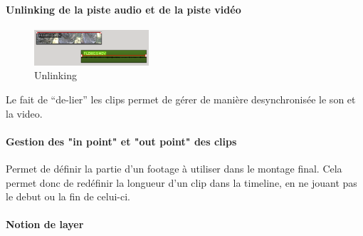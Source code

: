 \paragraph{}

\paragraph{Unlinking de la piste audio et de la piste vidéo}

\begin{figure}

  \vspace{-20pt} \begin{center}

  \includegraphics[width=0.38\textwidth]{images/unlinked}

  \end{center} \vspace{-30pt} \caption{Unlinking} \label{Yes}

  \vspace{-10pt}

\end{figure}

Le fait de ``de-lier'' les clips permet de gérer de manière
desynchronisée le son et la video.

\paragraph{Gestion des "in point" et  "out point" des clips} %

  Permet de définir la partie d'un footage à utiliser dans le montage
  final. Cela permet donc de redéfinir la longueur d'un clip dans la
  timeline, en ne jouant pas le debut ou la fin de celui-ci.

\paragraph{}

\paragraph{Notion de layer}

